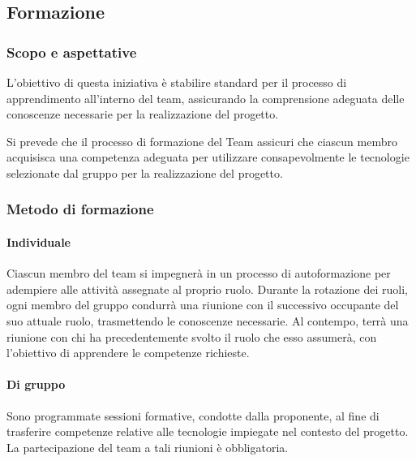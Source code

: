 \subsection{Formazione}
\subsubsection{Scopo e aspettative}
L'obiettivo di questa iniziativa è stabilire standard per il processo di apprendimento all'interno del team, assicurando la comprensione adeguata delle conoscenze necessarie per la realizzazione del progetto.

\vspace*{0.1cm}


Si prevede che il processo di formazione del Team assicuri che ciascun membro acquisisca una competenza adeguata per utilizzare consapevolmente le tecnologie selezionate dal gruppo per la realizzazione del progetto.

\subsubsection{Metodo di formazione}
\paragraph{Individuale}
Ciascun membro del team si impegnerà in un processo di autoformazione per adempiere alle attività assegnate al proprio ruolo. Durante la rotazione dei ruoli, ogni membro del gruppo condurrà una riunione con il successivo occupante del suo attuale ruolo, trasmettendo le conoscenze necessarie. Al contempo, terrà una riunione con chi ha precedentemente svolto il ruolo che esso assumerà, con l'obiettivo di apprendere le competenze richieste.

\paragraph{Di gruppo}
Sono programmate sessioni formative, condotte dalla proponente, al fine di trasferire competenze relative alle tecnologie impiegate nel contesto del progetto. La partecipazione del team a tali riunioni è obbligatoria.
 